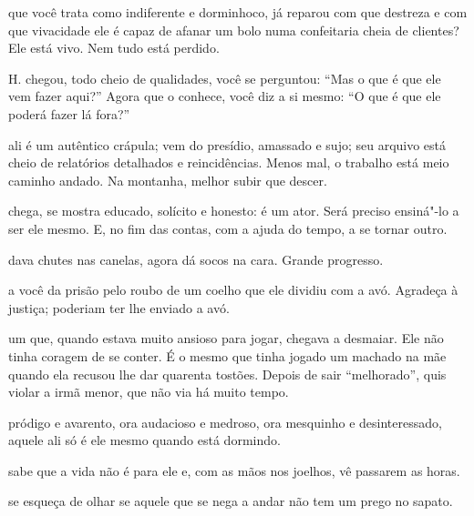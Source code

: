 \pagebreak
\thispagestyle{empty}
\movetooddpage

 que você trata como indiferente e dorminhoco, já reparou com que
destreza e com que vivacidade ele é capaz de afanar um bolo numa
confeitaria cheia de clientes? Ele está vivo. Nem tudo está perdido.



 H. chegou, todo cheio de qualidades, você se perguntou: ``Mas o
que é que ele vem fazer aqui?'' Agora que o conhece, você diz a si
mesmo: ``O que é que ele poderá fazer lá fora?''



 ali é um autêntico crápula; vem do presídio, amassado e sujo; seu
arquivo está cheio de relatórios detalhados e reincidências. Menos mal,
o trabalho está meio caminho andado. Na montanha, melhor subir que
descer.



 chega, se mostra educado, solícito e honesto: é um ator. Será
preciso ensiná"-lo a ser ele mesmo. E, no fim das contas, com a ajuda do
tempo, a se tornar outro.



 dava chutes nas canelas, agora dá socos na cara. Grande
progresso.

\pagebreak

 a você da prisão pelo roubo de um coelho que ele dividiu com a
avó. Agradeça à justiça; poderiam ter lhe enviado a avó.



 um que, quando estava muito ansioso para jogar, chegava a
desmaiar. Ele não tinha coragem de se conter. É o mesmo que tinha jogado
um machado na mãe quando ela recusou lhe dar quarenta tostões. Depois de
sair ``melhorado'', quis violar a irmã menor, que não via há muito
tempo.



 pródigo e avarento, ora audacioso e medroso, ora mesquinho e
desinteressado, aquele ali só é ele mesmo quando está dormindo.



 sabe que a vida não é para ele e, com as mãos nos joelhos, vê
passarem as horas.



 se esqueça de olhar se aquele que se nega a andar não tem um prego
no sapato.



